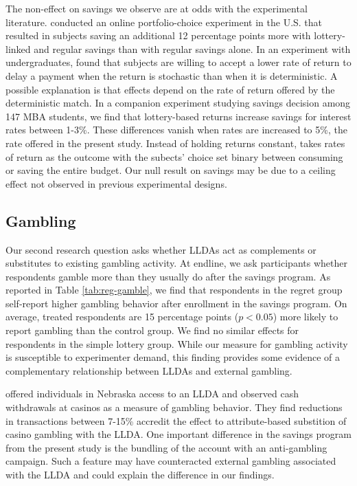 \documentclass[10pt]{article}
\begin{document}
		The non-effect on savings we observe are at odds with the experimental literature.  conducted an online portfolio-choice experiment in the U.S. that resulted in subjects saving an additional 12 percentage points more with lottery-linked and regular savings than with regular savings alone. In an experiment with undergraduates,  found that subjects are willing to accept a lower rate of return to delay a payment when the return is stochastic than when it is deterministic. A possible explanation is that effects depend on the rate of return offered by the deterministic match. In a companion experiment studying savings decision among 147 MBA students, we find that lottery-based returns increase savings for interest rates between 1-3\%. These differences vanish when rates are increased to 5\%, the rate offered in the present study. Instead of holding returns constant,  takes rates of return as the outcome with the subects' choice set binary between consuming or saving the entire budget. Our null result on savings may be due to a ceiling effect not observed in previous experimental designs.

	\subsection{Gambling}

		Our second research question asks whether LLDAs act as complements or substitutes to existing gambling activity. At endline, we ask participants whether respondents gamble more than they usually do after the savings program. As reported in Table \ref{tab:reg-gamble}, we find that respondents in the regret group self-report higher gambling behavior after enrollment in the savings program. On average, treated respondents are 15 percentage points ($p < 0.05$) more likely to report gambling than the control group. We find no similar effects for respondents in the simple lottery group. While our measure for gambling activity is susceptible to experimenter demand, this finding provides some evidence of a complementary relationship between LLDAs and external gambling.

		 offered individuals in Nebraska access to an LLDA and observed cash withdrawals at casinos as a measure of gambling behavior. They find reductions in transactions between 7-15\% accredit the effect to attribute-based substition of casino gambling with the LLDA. One important difference in the savings program from the present study is the bundling of the account with an anti-gambling campaign. Such a feature may have counteracted external gambling associated with the LLDA and could explain the difference in our findings.
\end{document}
